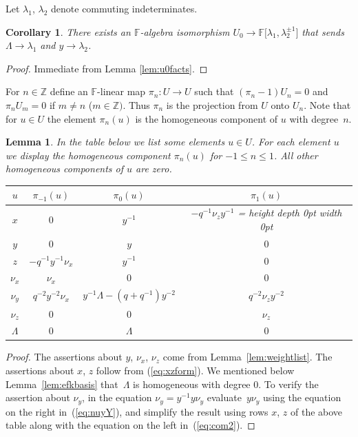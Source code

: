 \documentclass[11pt]{article}
\makeatletter
\numberwithin{equation}{section}
\newtheorem{Corollary}[Theorem]{Corollary}
\newtheorem{Lemma}[Theorem]{Lemma}
\def\tsep#1{%
  {\@tempdima=\ht\strutbox\advance\@tempdima #1
   \vrule height \@tempdima depth 0pt width 0pt\nobreak\hspace{0pt}%
  }%
}
\makeatother
\begin{document}
Let $\lambda_1$, $\lambda_2$ denote commuting
indeterminates.

\begin{Corollary}
\label{cor:laurant}
There exists an  $\mathbb F$-algebra isomorphism
$U_0 \to \mathbb F\lbrack \lambda_1, \lambda^{\pm 1}_2]$
that sends
$\Lambda \to \lambda_1$
and
$y \to \lambda_2$.
\end{Corollary}

\begin{proof}
Immediate from Lemma
\ref{lem:u0facts}.
\end{proof}

\begin{Definition}
\rm For $n \in \mathbb Z$ def\/ine an $\mathbb F$-linear map
$\pi_n:
U \to
U
$
such that $(\pi_n-1)U_n=0$ and
$\pi_n U_m=0$ if $m\not=n$  ($m\in \mathbb Z)$.
Thus $\pi_n$ is the projection
from $U $ onto $U_n$.
Note that for $u \in
U$ the element
$\pi_n(u)$
is the homogeneous component of $u$ with degree~$n$.
\end{Definition}

\begin{Lemma}
\label{lem:firsttable}
In the table below we list some
elements $u \in
U$.
For each element $u$ we display the homogeneous
component
$\pi_n(u)$ for $-1\leq n \leq 1$.
All other homogeneous components of $u$ are zero.
\begin{center}
\begin{tabular}{c| c  c c}
$u$ &  $\pi_{-1}(u)$ & $ \pi_0(u)$  & $ \pi_1(u)$
\\
\hline
\hline
$x$ & $0$ & $y^{-1}$ & $-q^{-1} \nu_z y^{-1}$\tsep{2pt}
\\
$y$ & $0$ & $y$ & $0$
\\
$z$ & $-q^{-1}y^{-1}\nu_x$ & $y^{-1}$ & $0$
\\
\hline
$\nu_x$ & $\nu_x$ & $0$ & $0$
\\
$\nu_y$ & $q^{-2}y^{-2}\nu_x$ & $y^{-1}\Lambda-(q+q^{-1})y^{-2}$
& $q^{-2}\nu_z y^{-2}$
\\
$\nu_z$ & $0$ & $0$ & $\nu_z$
\\
\hline
$\Lambda $ & $0$ & $\Lambda $ & $0$
\end{tabular}
        \end{center}
\end{Lemma}
\begin{proof}
The assertions about
$y$, $\nu_x$, $\nu_z$ come  from
Lemma~\ref{lem:weightlist}.
The assertions about $x$, $z$ follow from
(\ref{eq:xzform}).
We mentioned below
Lemma~\ref{lem:efkbasis}
that~$\Lambda $ is homogeneous with degree 0.
To verify the assertion about
$\nu_y$, in the equation $ \nu_y = y^{-1} y \nu_y$
evaluate~$y\nu_y $ using
the equation on the right in~(\ref{eq:nuyY}), and simplify the
result using
rows $x$, $z$ of the above table
along with the
equation on the left in~(\ref{eq:com2}).
\end{proof}
\end{document}
